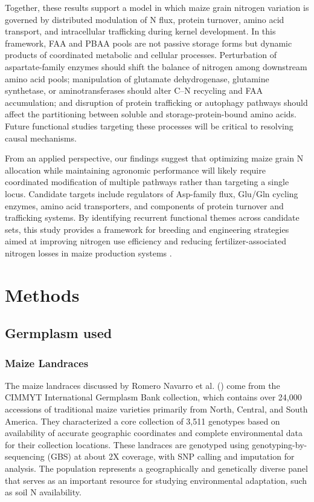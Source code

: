 \quad Together, these results support a model in which maize grain nitrogen variation is governed by distributed modulation of N flux, protein turnover, amino acid transport, and intracellular trafficking during kernel development. In this framework, FAA and PBAA pools are not passive storage forms but dynamic products of coordinated metabolic and cellular processes. Perturbation of aspartate-family enzymes should shift the balance of nitrogen among downstream amino acid pools; manipulation of glutamate dehydrogenase, glutamine synthetase, or aminotransferases should alter C--N recycling and FAA accumulation; and disruption of protein trafficking or autophagy pathways should affect the partitioning between soluble and storage-protein-bound amino acids. Future functional studies targeting these processes will be critical to resolving causal mechanisms.

\quad From an applied perspective, our findings suggest that optimizing maize grain N allocation while maintaining agronomic performance will likely require coordinated modification of multiple pathways rather than targeting a single locus. Candidate targets include regulators of Asp-family flux, Glu/Gln cycling enzymes, amino acid transporters, and components of protein turnover and trafficking systems. By identifying recurrent functional themes across candidate sets, this study provides a framework for breeding and engineering strategies aimed at improving nitrogen use efficiency and reducing fertilizer-associated nitrogen losses in maize production systems \citep{OjedaRivera2025NitrogenEfficientMaize}.



\section{Methods}\label{methods}

\subsection{Germplasm used}
\subsubsection{Maize Landraces}
The maize landraces discussed by Romero Navarro et al. (\cite{RomeroNavarro2017Landraces}) come from the CIMMYT International Germplasm Bank collection, which contains over 24,000 accessions of traditional maize varieties primarily from North, Central, and South America. They characterized a core collection of 3,511 genotypes based on availability of accurate geographic coordinates and complete environmental data for their collection locations. These landraces are genotyped using genotyping-by-sequencing (GBS) at about 2X coverage, with SNP calling and imputation for analysis. The population represents a geographically and genetically diverse panel that serves as an important resource for studying environmental adaptation, such as soil N availability.


